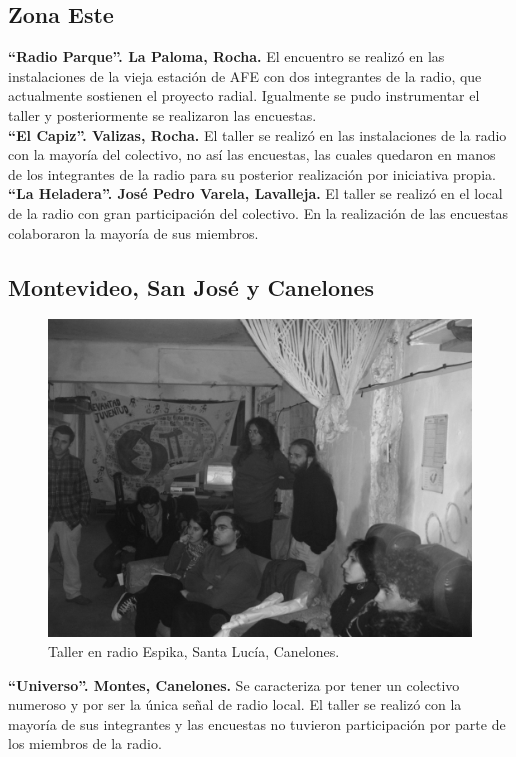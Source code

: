\subsection{Zona Este}

\textbf{“Radio Parque”. La Paloma, Rocha.} El encuentro se realizó en las instalaciones de la vieja estación de AFE con dos integrantes de la radio, que actualmente sostienen el proyecto radial. Igualmente se pudo instrumentar el taller y posteriormente se realizaron las encuestas.\\

\textbf{“El Capiz”. Valizas, Rocha.} El taller se realizó en las instalaciones de la radio con la mayoría del colectivo, no así las encuestas, las cuales quedaron en manos de los integrantes de la radio para su posterior realización por iniciativa propia.\\

\textbf{“La Heladera”. José Pedro Varela, Lavalleja.} El taller se realizó en el local de la radio con gran participación del colectivo. En la realización de las encuestas colaboraron la mayoría de sus miembros.\\

\subsection{Montevideo, San José y Canelones}
\begin{figure}[htbp!]
 \centering
 \includegraphics[scale=0.1,keepaspectratio=true]{./Cap/Fotos/Espikabyn.jpg}
 \caption{Taller en radio Espika, Santa Lucía, Canelones.}
 \label{Espika}
\end{figure}
\textbf{“Universo”. Montes, Canelones.} Se caracteriza por tener un colectivo numeroso y por ser la única señal de radio local. El taller se realizó con la mayoría de sus integrantes y las encuestas no tuvieron participación por parte de los miembros de la radio.\\

